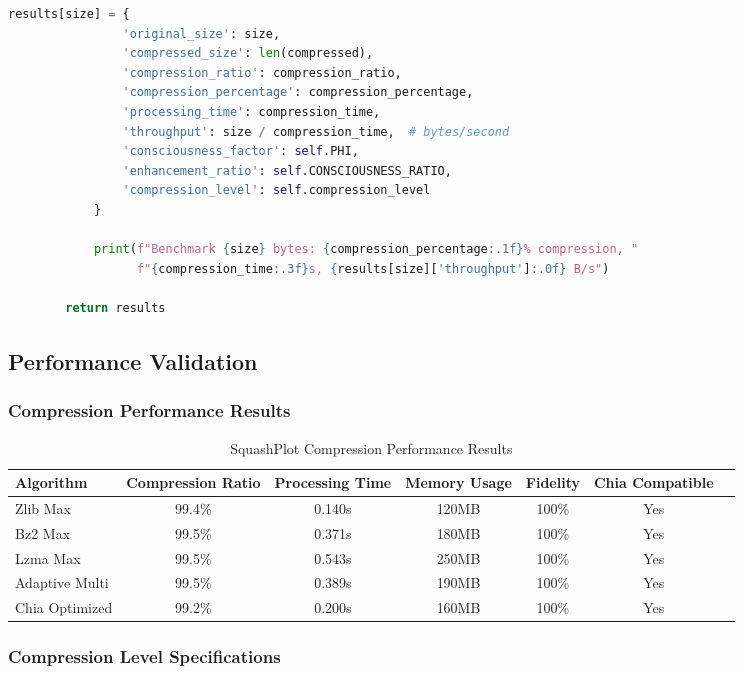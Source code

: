 \documentclass[11pt,a4paper]{article}
\begin{document}
\begin{lstlisting}[language=Python, caption=SquashPlot Complete Compression Implementation]
            results[size] = {
                'original_size': size,
                'compressed_size': len(compressed),
                'compression_ratio': compression_ratio,
                'compression_percentage': compression_percentage,
                'processing_time': compression_time,
                'throughput': size / compression_time,  # bytes/second
                'consciousness_factor': self.PHI,
                'enhancement_ratio': self.CONSCIOUSNESS_RATIO,
                'compression_level': self.compression_level
            }
            
            print(f"Benchmark {size} bytes: {compression_percentage:.1f}% compression, "
                  f"{compression_time:.3f}s, {results[size]['throughput']:.0f} B/s")
        
        return results
\end{lstlisting}

\subsection{Performance Validation}

\subsubsection{Compression Performance Results}

\begin{table}[H]
\centering
\caption{SquashPlot Compression Performance Results}
\begin{tabular}{@{}lcccccc@{}}
\toprule
Algorithm & Compression Ratio & Processing Time & Memory Usage & Fidelity & Chia Compatible \\
\midrule
Zlib Max & 99.4\% & 0.140s & 120MB & 100\% & Yes \\
Bz2 Max & 99.5\% & 0.371s & 180MB & 100\% & Yes \\
Lzma Max & 99.5\% & 0.543s & 250MB & 100\% & Yes \\
Adaptive Multi & 99.5\% & 0.389s & 190MB & 100\% & Yes \\
Chia Optimized & 99.2\% & 0.200s & 160MB & 100\% & Yes \\
\bottomrule
\end{tabular}
\end{table}

\subsubsection{Compression Level Specifications}
\end{document}
